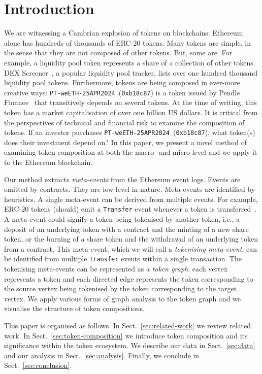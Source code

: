\section{Introduction}\label{sec:introduction}

We are witnessing a Cambrian explosion of tokens on blockchains:
Ethereum alone has hundreds of thousands of ERC-20 tokens.  Many
tokens are simple, in the sense that they are not composed of other
tokens.  But, some are.  For example, a liquidity pool token
represents a share of a collection of other tokens.  DEX
Screener~\cite{dex-screener-xx}, a popular liquidity pool tracker,
lists over one hundred thousand liquidity pool tokens.  Furthermore,
tokens are being composed in ever-more creative ways:
\texttt{PT-weETH-25APR2024}~(\texttt{0xb18c87}) is a token issued by
Pendle Finance~\cite{nguyen-vuong-22} that transitively depends on
several tokens.  At the time of writing, this token has a market
capitalisation of over one billion US dollars.  It is critical from
the perspectives of technical and financial risk to examine the
composition of tokens.  If an investor purchases
\texttt{PT-weETH-25APR2024}~(\texttt{0xb18c87}), what token(s) does
their investment depend on?  In this paper, we present a novel method
of examining token composition at both the macro- and micro-level and
we apply it to the Ethereum blockchain.

Our method extracts \textit{meta-events} from the Ethereum event logs.
Events are emitted by contracts.  They are low-level in nature.
Meta-events are identified by heuristics.  A single meta-event can be
derived from multiple events.  For example, ERC-20 tokens (should)
emit a \texttt{Transfer} event whenever a token is
transferred~\cite{vogelsteller-buterin-15}.  A meta-event could
signify a token being tokenised by another token, i.e., a deposit of
an underlying token with a contract and the minting of a new share
token, or the burning of a share token and the withdrawal of an
underlying token from a contract.  This meta-event, which we will call
a \textit{tokenising meta-event}, can be identified from multiple
\texttt{Transfer} events within a single transaction.  The tokenising
meta-events can be represented as a \textit{token graph}: each vertex
represents a token and each directed edge represents the token
corresponding to the source vertex being tokenised by the token
corresponding to the target vertex.  We apply various forms of graph
analysis to the token graph and we visualise the structure of token
compositions.

This paper is organised as follows.  In Sect.~\ref{sec:related-work}
we review related work.  In Sect.~\ref{sec:token-composition} we
introduce token composition and its significance within the token
ecosystem.  We describe our data in Sect.~\ref{sec:data} and our
analysis in Sect.~\ref{sec:analysis}.  Finally, we conclude in
Sect.~\ref{sec:conclusion}.
